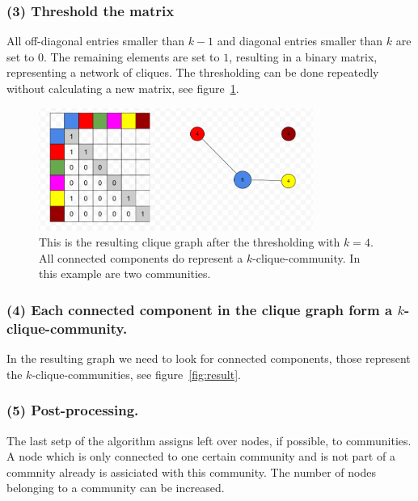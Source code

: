\documentclass[runningheads,a4paper]{llncs}
\begin{document}
\subsubsection{(3) Threshold the matrix}
All off-diagonal entries smaller than $k-1$ and diagonal entries smaller than $k$ are set to $0$.
The remaining elements are set to $1$, resulting in a binary matrix, representing a network of cliques. The thresholding can be done repeatedly without calculating a new matrix, see figure~\ref{fig:matrixtrashed}.

\begin{figure}
\begin{center}
	\includegraphics[width=0.8\textwidth]{matrixtrashed}
		\caption{This is the resulting clique graph after the thresholding with $k=4$. All connected components do represent a $k$-clique-community. In this example are two communities.}
		\label{fig:matrixtrashed}
\end{center}
\end{figure}
 
\subsubsection{(4) Each connected component in the clique graph form a $k$-clique-community.}
In the resulting graph we need to look for connected components, those represent the $k$-clique-communities, see figure~\ref{fig:result}.

\subsubsection{(5) Post-processing.}
The last setp of the algorithm assigns left over nodes, if possible, to communities. A node which is only connected to one certain community and is not part of a commnity already is assiciated with this community. The number of nodes belonging to a community can be increased.
\end{document}
